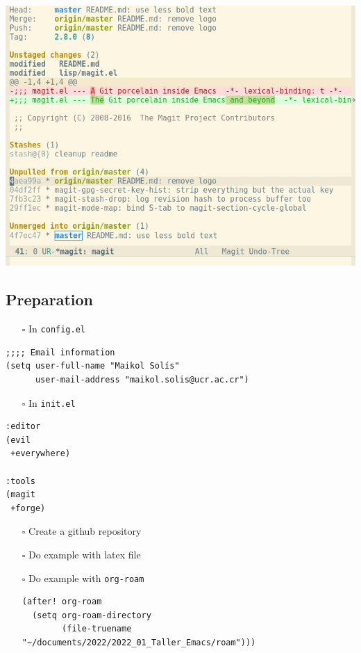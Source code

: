 \documentclass[11pt]{article}
\begin{document}
\begin{center}
\includegraphics[width=.9\linewidth]{./magit.png}
\end{center}


\subsection{Preparation}
\label{sec:orgec5840e}

\begin{itemize}
\item[{$\square$}] In \texttt{config.el}
\end{itemize}
\begin{verbatim}
;;;; Email information
(setq user-full-name "Maikol Solís"
      user-mail-address "maikol.solis@ucr.ac.cr")
\end{verbatim}

\begin{itemize}
\item[{$\square$}] In \texttt{init.el}
\end{itemize}
\begin{verbatim}
:editor
(evil
 +everywhere)

:tools
(magit
 +forge)
\end{verbatim}

\begin{itemize}
\item[{$\square$}] Create a github repository
\item[{$\square$}] Do example with latex file
\item[{$\square$}] Do example with \texttt{org-roam}
\begin{verbatim}
(after! org-roam
  (setq org-roam-directory
        (file-truename "~/documents/2022/2022_01_Taller_Emacs/roam")))
\end{verbatim}
\end{itemize}
\end{document}
